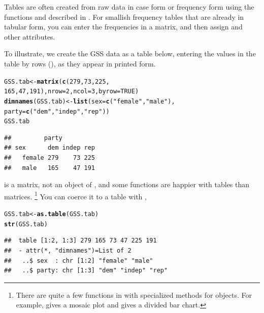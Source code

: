 \documentclass[11pt]{book}\usepackage[]{graphicx}\usepackage[]{color}
\makeatletter
\newcommand{\hlnum}[1]{\textcolor[rgb]{0.686,0.059,0.569}{#1}}%
\newcommand{\hlstr}[1]{\textcolor[rgb]{0.192,0.494,0.8}{#1}}%
\newcommand{\hlstd}[1]{\textcolor[rgb]{0.345,0.345,0.345}{#1}}%
\newcommand{\hlkwb}[1]{\textcolor[rgb]{0.69,0.353,0.396}{#1}}%
\newcommand{\hlkwc}[1]{\textcolor[rgb]{0.333,0.667,0.333}{#1}}%
\newcommand{\hlkwd}[1]{\textcolor[rgb]{0.737,0.353,0.396}{\textbf{#1}}}%
\newenvironment{kframe}{%
 \def\at@end@of@kframe{}%
 \ifinner\ifhmode%
  \def\at@end@of@kframe{\end{minipage}}%
  \begin{minipage}{\columnwidth}%
 \fi\fi%
 \def\FrameCommand##1{\hskip\@totalleftmargin \hskip-\fboxsep
 \colorbox{shadecolor}{##1}\hskip-\fboxsep
     \hskip-\linewidth \hskip-\@totalleftmargin \hskip\columnwidth}%
 \MakeFramed {\advance\hsize-\width
   \@totalleftmargin\z@ \linewidth\hsize
   \@setminipage}}%
 {\par\unskip\endMakeFramed%
 \at@end@of@kframe}
\newenvironment{knitrout}{}{} %
\renewenvironment{knitrout}{\small\renewcommand{\baselinestretch}{.85}}{} %
\makeatother
\begin{document}
Tables are often created from raw data in case form or frequency form using the
functions  and  described in .
For smallish frequency tables that are already in tabular form, you can enter
the frequencies in a matrix, and then assign  and other attributes.

To illustrate, we create the GSS data as a table below, entering the
values in the table by rows (), as they appear in
printed form.

\begin{knitrout}
\color{fgcolor}\begin{kframe}
\begin{alltt}
\hlstd{GSS.tab} \hlkwb{<-} \hlkwd{matrix}\hlstd{(}\hlkwd{c}\hlstd{(}\hlnum{279}\hlstd{,} \hlnum{73}\hlstd{,} \hlnum{225}\hlstd{,}
                    \hlnum{165}\hlstd{,} \hlnum{47}\hlstd{,} \hlnum{191}\hlstd{),} \hlkwc{nrow}\hlstd{=}\hlnum{2}\hlstd{,} \hlkwc{ncol}\hlstd{=}\hlnum{3}\hlstd{,} \hlkwc{byrow}\hlstd{=}\hlnum{TRUE}\hlstd{)}
\hlkwd{dimnames}\hlstd{(GSS.tab)} \hlkwb{<-} \hlkwd{list}\hlstd{(}\hlkwc{sex}\hlstd{=}\hlkwd{c}\hlstd{(}\hlstr{"female"}\hlstd{,} \hlstr{"male"}\hlstd{),}
                          \hlkwc{party}\hlstd{=}\hlkwd{c}\hlstd{(}\hlstr{"dem"}\hlstd{,} \hlstr{"indep"}\hlstd{,} \hlstr{"rep"}\hlstd{))}
\hlstd{GSS.tab}
\end{alltt}
\begin{verbatim}
##         party
## sex      dem indep rep
##   female 279    73 225
##   male   165    47 191
\end{verbatim}
\end{kframe}
\end{knitrout}

 is a matrix, not an object of , and some functions
are happier with tables than matrices.%
\footnote{
There are quite a few functions in \R with specialized methods for
 objects. For example,  gives a mosaic
plot and  gives a divided bar chart.
}
You can coerce it to a table with ,
\begin{knitrout}
\color{fgcolor}\begin{kframe}
\begin{alltt}
\hlstd{GSS.tab} \hlkwb{<-} \hlkwd{as.table}\hlstd{(GSS.tab)}
\hlkwd{str}\hlstd{(GSS.tab)}
\end{alltt}
\begin{verbatim}
##  table [1:2, 1:3] 279 165 73 47 225 191
##  - attr(*, "dimnames")=List of 2
##   ..$ sex  : chr [1:2] "female" "male"
##   ..$ party: chr [1:3] "dem" "indep" "rep"
\end{verbatim}
\end{kframe}
\end{knitrout}
\end{document}
